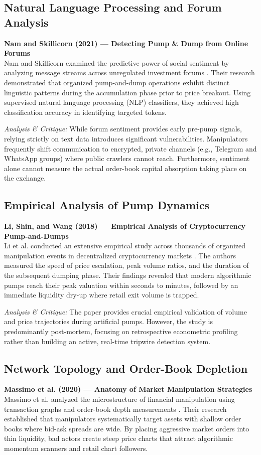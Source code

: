 \subsection{Natural Language Processing and Forum Analysis}
\noindent \textbf{Nam and Skillicorn (2021) --- Detecting Pump \& Dump from Online Forums} \\
Nam and Skillicorn examined the predictive power of social sentiment by analyzing message streams across unregulated investment forums \cite{nam2021detecting}. Their research demonstrated that organized pump-and-dump operations exhibit distinct linguistic patterns during the accumulation phase prior to price breakout. Using supervised natural language processing (NLP) classifiers, they achieved high classification accuracy in identifying targeted tokens. 

\textit{Analysis \& Critique:} While forum sentiment provides early pre-pump signals, relying strictly on text data introduces significant vulnerabilities. Manipulators frequently shift communication to encrypted, private channels (e.g., Telegram and WhatsApp groups) where public crawlers cannot reach. Furthermore, sentiment alone cannot measure the actual order-book capital absorption taking place on the exchange.

\subsection{Empirical Analysis of Pump Dynamics}
\noindent \textbf{Li, Shin, and Wang (2018) --- Empirical Analysis of Cryptocurrency Pump-and-Dumps} \\
Li et al. conducted an extensive empirical study across thousands of organized manipulation events in decentralized cryptocurrency markets \cite{li2018cryptocurrency}. The authors measured the speed of price escalation, peak volume ratios, and the duration of the subsequent dumping phase. Their findings revealed that modern algorithmic pumps reach their peak valuation within seconds to minutes, followed by an immediate liquidity dry-up where retail exit volume is trapped.

\textit{Analysis \& Critique:} The paper provides crucial empirical validation of volume and price trajectories during artificial pumps. However, the study is predominantly post-mortem, focusing on retrospective econometric profiling rather than building an active, real-time tripwire detection system.

\subsection{Network Topology and Order-Book Depletion}
\noindent \textbf{Massimo et al. (2020) --- Anatomy of Market Manipulation Strategies} \\
Massimo et al. analyzed the microstructure of financial manipulation using transaction graphs and order-book depth measurements \cite{massimo2020anatomy}. Their research established that manipulators systematically target assets with shallow order books where bid-ask spreads are wide. By placing aggressive market orders into thin liquidity, bad actors create steep price charts that attract algorithmic momentum scanners and retail chart followers.

